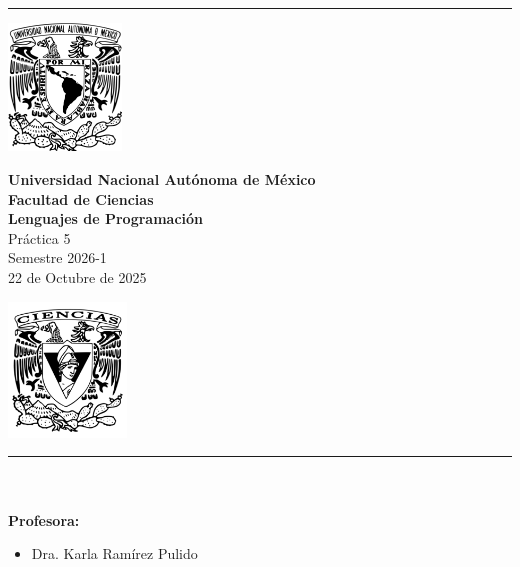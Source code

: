 \documentclass[12pt,letterpaper]{article}
\begin{document}
\begin{titlepage}
    
\setlength{\parindent}{0cm}
\rule{\linewidth}{0.1mm}
\begin{center}
    \begin{minipage}{2.5cm}
    	\begin{center}
	    \includegraphics[height=3.4cm]{imagenes/logo_unam.png}
    	\end{center}
    \end{minipage}\hfill
    \begin{minipage}{9.6cm}
    	\begin{center}
    	\textbf{Universidad Nacional Autónoma de México}\\[0.1cm]
        \textbf{Facultad de Ciencias}\\[0.1cm]
        \textbf{Lenguajes de Programación}\\[0.1cm]
        Práctica 5\\[0.1cm]
        Semestre 2026-1\\[0.1cm]
        22 de Octubre de 2025
    	\end{center}
    \end{minipage}\hfill
    \begin{minipage}{3cm}
    	\begin{center}
    	\includegraphics[height=3.6cm]{imagenes/Logo_FC.png}
    	\end{center}
    \end{minipage}
\end{center}

\rule{\linewidth}{0.1mm}\\\\

\textbf{Profesora:}
\begin{itemize}
    \item Dra. Karla Ram\'irez Pulido \\\\
\end{itemize}


\end{titlepage}
\end{document}
